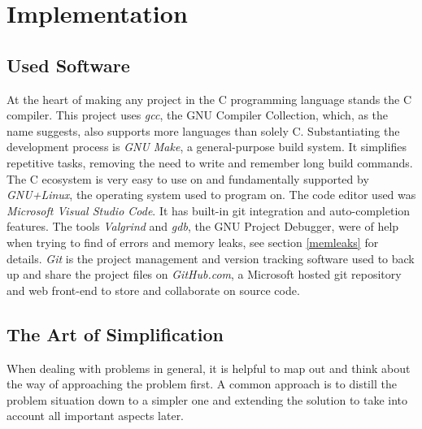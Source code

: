 \documentclass[12pt,a4paper]{article}
\begin{document}
\section{Implementation}
\subsection{Used Software}
At the heart of making any project in the C programming language
stands the C compiler. This project uses
\emph{gcc}, the GNU Compiler Collection, which, as the name suggests, also 
supports more languages than solely C. Substantiating the development process is 
\emph{GNU Make}, a general-purpose build system. It simplifies repetitive tasks,
removing the need to write and remember long build commands.
The C ecosystem is very easy to use on and fundamentally supported by 
\emph{GNU+Linux}, the operating system used to program on.
The code editor used was \emph{Microsoft Visual Studio Code}.
It has built-in git integration and auto-completion features.
The tools \emph{Valgrind} and \emph{gdb}, the GNU Project Debugger, were of help
when trying to find of errors and memory leaks, see section \ref{memleaks} for details.
\emph{Git} is the project management and version tracking software used to back up and share
the project files on \emph{GitHub.com}, a Microsoft hosted git repository and
web front-end to store and collaborate on source code.

\subsection{The Art of Simplification}
When dealing with problems in general, it is helpful to map out and think about
the way of approaching the problem first. A common approach is to distill the
problem situation down to a simpler one and extending the solution to take into
account all important aspects later.
\end{document}
